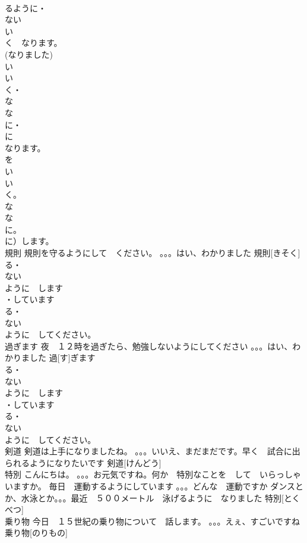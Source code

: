 \documentclass[8pt]{extreport}
\begin{document}
\begin{CJK}{UTF8}{min}
\\	るように・
\\	ない
\\	い　
\\	く　なります。
\\	(なりました) 
\\	い
\\	い
\\	く・
\\	な
\\	な
\\	に・
\\	に　
\\	なります。
\\	を
\\	い
\\	い
\\	く。
\\	な
\\	な
\\	に。
\\	に）します。
\\	規則	規則を守るようにして　ください。 。。。はい、わかりました	規則[きそく]			
\\	る・
\\	ない
\\	ように　します
\\	・しています
\\	る・
\\	ない
\\	ように　してください。
\\	過ぎます	夜　１２時を過ぎたら、勉強しないようにしてください 。。。はい、わかりました	過[す]ぎます			
\\	る・
\\	ない
\\	ように　します
\\	・しています
\\	る・
\\	ない
\\	ように　してください。
\\	剣道	剣道は上手になりましたね。 。。。いいえ、まだまだです。早く　試合に出られるようになりたいです	剣道[けんどう]					
\\	特別	こんにちは。 。。。お元気ですね。何か　特別なことを　して　いらっしゃいますか。 毎日　運動するようにしています 。。。どんな　運動ですか ダンスとか、水泳とか。。。最近　５００メートル　泳げるように　なりました	特別[とくべつ]			
\\	乗り物	今日　１５世紀の乗り物について　話します。 。。。えぇ、すごいですね	乗り物[のりもの]			

\end{CJK}
\end{document}
